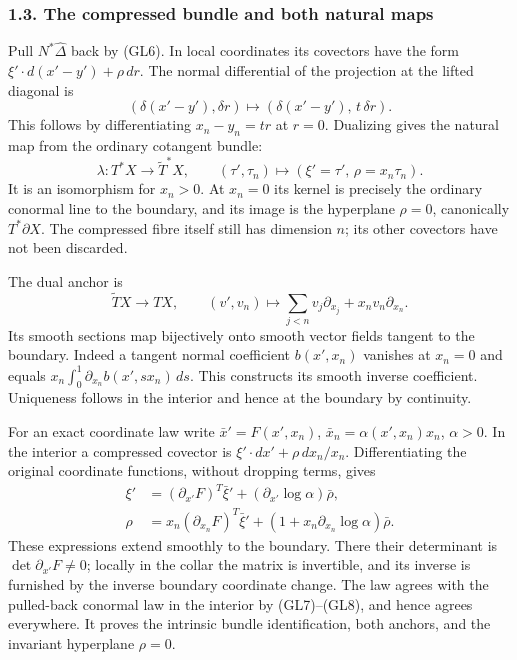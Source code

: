 \documentclass[
  11pt,
]{article}
\begin{document}
\subsubsection{1.3. The compressed bundle and both natural
maps}\label{the-compressed-bundle-and-both-natural-maps}

Pull \(N^*\widehat\Delta\) back by (GL6). In local coordinates its
covectors have the form \(\xi'\cdot d(x'-y')+\rho\,dr\). The normal
differential of the projection at the lifted diagonal is \[
 (\delta(x'-y'),\delta r)\longmapsto
       (\delta(x'-y'),\,t\,\delta r).
 \tag{GL7}
\] This follows by differentiating \(x_n-y_n=t r\) at \(r=0\). Dualizing
gives the natural map from the ordinary cotangent bundle: \[
 \lambda:T^*X\longrightarrow\widetilde T^*X,\qquad
 (\tau',\tau_n)\longmapsto(\xi'=\tau',\,\rho=x_n\tau_n).
 \tag{GL8}
\] It is an isomorphism for \(x_n>0\). At \(x_n=0\) its kernel is
precisely the ordinary conormal line to the boundary, and its image is
the hyperplane \(\rho=0\), canonically \(T^*\partial X\). The compressed
fibre itself still has dimension \(n\); its other covectors have not
been discarded.

The dual anchor is \[
 \widetilde TX\longrightarrow TX,\qquad
 (v',v_n)\longmapsto
       \sum_{j<n}v_j\partial_{x_j}+x_n v_n\partial_{x_n}.
 \tag{GL9}
\] Its smooth sections map bijectively onto smooth vector fields tangent
to the boundary. Indeed a tangent normal coefficient \(b(x',x_n)\)
vanishes at \(x_n=0\) and equals
\(x_n\int_0^1\partial_{x_n}b(x',s x_n)\,ds\). This constructs its smooth
inverse coefficient. Uniqueness follows in the interior and hence at the
boundary by continuity.

For an exact coordinate law write \(\bar x'=F(x',x_n)\),
\(\bar x_n=\alpha(x',x_n)x_n\), \(\alpha>0\). In the interior a
compressed covector is \(\xi'\cdot dx'+\rho\,dx_n/x_n\). Differentiating
the original coordinate functions, without dropping terms, gives \[
 \begin{aligned}
 \xi'&=(\partial_{x'}F)^T\bar\xi'
               +(\partial_{x'}\log\alpha)\bar\rho,\\
 \rho&=x_n(\partial_{x_n}F)^T\bar\xi'
               +(1+x_n\partial_{x_n}\log\alpha)\bar\rho .
 \end{aligned}
 \tag{GL10}
\] These expressions extend smoothly to the boundary. There their
determinant is \(\det\partial_{x'}F\ne0\); locally in the collar the
matrix is invertible, and its inverse is furnished by the inverse
boundary coordinate change. The law agrees with the pulled-back conormal
law in the interior by (GL7)--(GL8), and hence agrees everywhere. It
proves the intrinsic bundle identification, both anchors, and the
invariant hyperplane \(\rho=0\).
\end{document}
